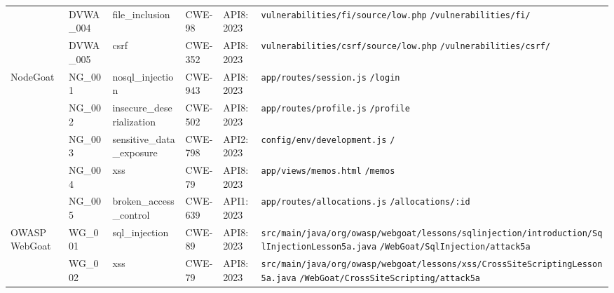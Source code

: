 \begin{table}[htbp]
\begin{tabular}{|p{1.7cm}|p{1.4cm}|p{2.6cm}|p{1.3cm}|p{1.5cm}|p{4.6cm}|}
 & DVWA\_004 & file\_\allowbreak{}inclusion & CWE-98 & API8:2023 & \texttt{vulnerabilities/\allowbreak{}fi/\allowbreak{}source/\allowbreak{}low.php} \newline \texttt{/\allowbreak{}vulnerabilities/\allowbreak{}fi/\allowbreak{}} \\
 & DVWA\_005 & csrf & CWE-352 & API8:2023 & \texttt{vulnerabilities/\allowbreak{}csrf/\allowbreak{}source/\allowbreak{}low.php} \newline \texttt{/\allowbreak{}vulnerabilities/\allowbreak{}csrf/\allowbreak{}} \\
\hline
NodeGoat & NG\_001 & nosql\_\allowbreak{}injection & CWE-943 & API8:2023 & \texttt{app/\allowbreak{}routes/\allowbreak{}session.js} \newline \texttt{/\allowbreak{}login} \\
 & NG\_002 & insecure\_\allowbreak{}deserialization & CWE-502 & API8:2023 & \texttt{app/\allowbreak{}routes/\allowbreak{}profile.js} \newline \texttt{/\allowbreak{}profile} \\
 & NG\_003 & sensitive\_\allowbreak{}data\_\allowbreak{}exposure & CWE-798 & API2:2023 & \texttt{config/\allowbreak{}env/\allowbreak{}development.js} \newline \texttt{/\allowbreak{}} \\
 & NG\_004 & xss & CWE-79 & API8:2023 & \texttt{app/\allowbreak{}views/\allowbreak{}memos.html} \newline \texttt{/\allowbreak{}memos} \\
 & NG\_005 & broken\_\allowbreak{}access\_\allowbreak{}control & CWE-639 & API1:2023 & \texttt{app/\allowbreak{}routes/\allowbreak{}allocations.js} \newline \texttt{/\allowbreak{}allocations/\allowbreak{}:id} \\
\hline
OWASP WebGoat & WG\_001 & sql\_\allowbreak{}injection & CWE-89 & API8:2023 & \texttt{src/\allowbreak{}main/\allowbreak{}java/\allowbreak{}org/\allowbreak{}owasp/\allowbreak{}webgoat/\allowbreak{}lessons/\allowbreak{}sqlinjection/\allowbreak{}introduction/\allowbreak{}SqlInjectionLesson5a.java} \newline \texttt{/\allowbreak{}WebGoat/\allowbreak{}SqlInjection/\allowbreak{}attack5a} \\
 & WG\_002 & xss & CWE-79 & API8:2023 & \texttt{src/\allowbreak{}main/\allowbreak{}java/\allowbreak{}org/\allowbreak{}owasp/\allowbreak{}webgoat/\allowbreak{}lessons/\allowbreak{}xss/\allowbreak{}CrossSiteScriptingLesson5a.java} \newline \texttt{/\allowbreak{}WebGoat/\allowbreak{}CrossSiteScripting/\allowbreak{}attack5a} \\

\end{tabular}
\end{table}
